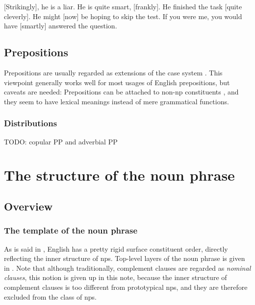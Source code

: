\documentclass[UTF8, a4paper, oneside, scheme=plain]{ctexrep}
\newcommand*{\citesec}[1]{\S~{#1}}
\newcommand*{\citepage}[1]{pp.~{#1}}
\newcommand*{\term}[1]{\emph{#1}}
\begin{document}
\begin{exe}
    \ex\label{ex:overview.adverb-1} [Strikingly], he is a liar.
    \ex\label{ex:overview.adverb-2} He is quite smart, [frankly].
    \ex\label{ex:overview.adverb-5} He finished the task [quite cleverly].
    \ex\label{ex:overview.adverb-3} He might [now] be hoping to skip the test.
    \ex\label{ex:overview.adverb-4} If you were me, you would have [smartly] answered the question.
\end{exe}

\section{Prepositions}

Prepositions are usually regarded as extensions of the case system 
\citep[\citesec{5.4}]{dixon2009basic1}.
This viewpoint generally works well for most usages of English prepositions,
but caveats are needed:
Prepositions can be attached to non-\acs{np} constituents \citep[\citepage{609}]{cgel},
and they seem to have lexical meanings instead of mere grammatical functions.

\subsection{Distributions}

TODO: copular PP and adverbial PP

\chapter{The structure of the noun phrase}\label{chap:np}

\section{Overview}

\subsection{The template of the noun phrase}

As is said in ,
English has a pretty rigid surface constituent order,
directly reflecting the inner structure of \acs{np}s.
Top-level layers of the noun phrase is given in .
Note that although traditionally, complement clauses are regarded as \term{nominal clauses},
this notion is given up in this note,
because the inner structure of complement clauses is too different from prototypical \acs{np}s,
and they are therefore excluded from the class of \acs{np}s.
\end{document}
